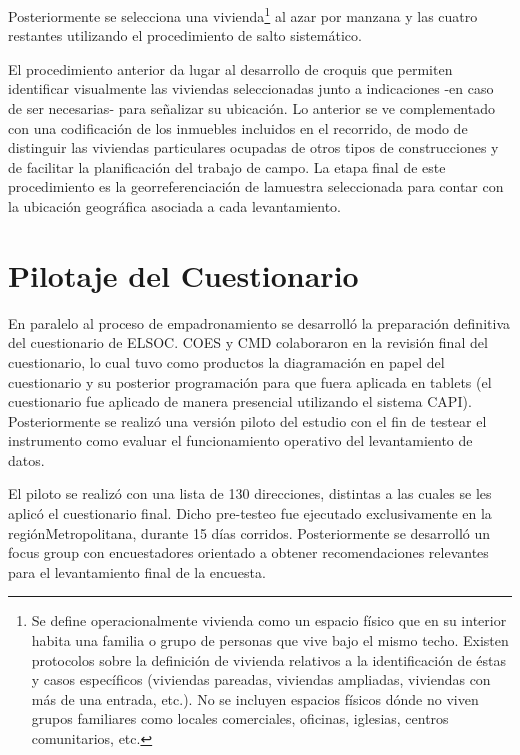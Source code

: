 \documentclass[
]{book}
\begin{document}
Posteriormente se selecciona una vivienda\footnote{Se define operacionalmente vivienda como un espacio físico que en su interior habita una familia o grupo de personas que vive bajo el mismo techo. Existen protocolos sobre la definición de vivienda relativos a la identificación de éstas y casos específicos (viviendas pareadas, viviendas ampliadas, viviendas con más de una entrada, etc.). No se incluyen espacios físicos dónde no viven grupos familiares como locales comerciales, oficinas, iglesias, centros comunitarios, etc.} al azar por manzana y las cuatro restantes utilizando el procedimiento de salto sistemático.

El procedimiento anterior da lugar al desarrollo de croquis que permiten identificar visualmente las viviendas seleccionadas junto a indicaciones -en caso de ser necesarias- para señalizar su ubicación. Lo anterior se ve complementado con una codificación de los inmuebles incluidos en el recorrido, de modo de distinguir las viviendas particulares ocupadas de otros tipos de construcciones y de facilitar la planificación del trabajo de campo. La etapa final de este procedimiento es la georreferenciación de lamuestra seleccionada para contar con la ubicación geográfica asociada a cada levantamiento.

\hypertarget{pilotaje-del-cuestionario}{%
\section{Pilotaje del Cuestionario}\label{pilotaje-del-cuestionario}}

En paralelo al proceso de empadronamiento se desarrolló la preparación definitiva del cuestionario de ELSOC. COES y CMD colaboraron en la revisión final del cuestionario, lo cual tuvo como productos la diagramación en papel del cuestionario y su posterior programación para que fuera aplicada en tablets (el cuestionario fue aplicado de manera presencial utilizando el sistema CAPI). Posteriormente se realizó una versión piloto del estudio con el fin de testear el instrumento como evaluar el funcionamiento operativo del levantamiento de datos.

El piloto se realizó con una lista de 130 direcciones, distintas a las cuales se les aplicó el cuestionario final. Dicho pre-testeo fue ejecutado exclusivamente en la regiónMetropolitana, durante 15 días corridos. Posteriormente se desarrolló un focus group con encuestadores orientado a obtener recomendaciones relevantes para el levantamiento final de la encuesta.
\end{document}
